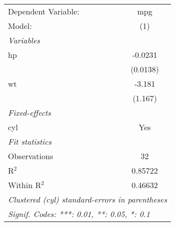 \begin{tabular}{lc} 
   \tabularnewline \midrule \midrule 
   Dependent Variable: & mpg\\   
   Model:              & (1)\\   
   \midrule 
   \emph{Variables}\\ 
   hp                  & -0.0231\\    
                       & (0.0138)\\    
   wt                  & -3.181\\    
                       & (1.167)\\    
   \midrule 
   \emph{Fixed-effects}\\ 
   cyl                 & Yes\\   
   \midrule 
   \emph{Fit statistics}\\ 
   Observations        & 32\\   
   R$^2$               & 0.85722\\   
   Within R$^2$        & 0.46632\\   
   \midrule \midrule 
   \multicolumn{2}{l}{\emph{Clustered (cyl) standard-errors in parentheses}}\\ 
   \multicolumn{2}{l}{\emph{Signif. Codes: ***: 0.01, **: 0.05, *: 0.1}}\\ 
\end{tabular} 
